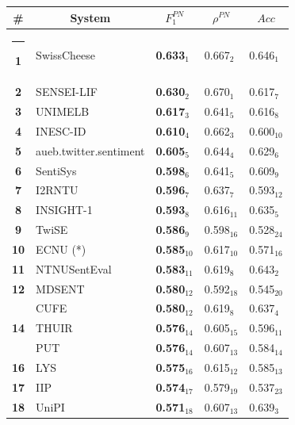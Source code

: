 \documentclass[11pt,letterpaper]{article}
\begin{document}
\renewcommand{\baselinestretch}{0.78}
\begin{table}[tbh]
  \centering
  \begin{small}
    \renewcommand{\arraystretch}{1.0}%
    \resizebox{\columnwidth}{!} {
    \begin{tabular}{|c|l|l|l|l|}
      \hline\rule[0ex]{0mm}{2ex}
      \bf \# & \multicolumn{1}{c|}{\bf System} & \multicolumn{1}{c|}{$F_{1}^{PN}$} & \multicolumn{1}{c|}{$\rho^{PN}$} & \multicolumn{1}{c|}{$Acc$} \\
      \hline\rule[0ex]{-1mm}{2ex} 
      \bf 1 & SwissCheese & \bf 0.633$_{1}$ & 0.667$_{2}$ & 0.646$_{1}$ \\
      \bf 2 & SENSEI-LIF & \bf 0.630$_{2}$ & 0.670$_{1}$ & 0.617$_{7}$ \\
      \bf 3 & UNIMELB & \bf 0.617$_{3}$ & 0.641$_{5}$ & 0.616$_{8}$ \\
      \bf 4 & INESC-ID & \bf 0.610$_{4}$ & 0.662$_{3}$ & 0.600$_{10}$ \\
      \bf 5 & aueb.twitter.sentiment & \bf 0.605$_{5}$ & 0.644$_{4}$ & 0.629$_{6}$ \\
      \bf 6 & SentiSys & \bf 0.598$_{6}$ & 0.641$_{5}$ & 0.609$_{9}$ \\
      \bf 7 & I2RNTU & \bf 0.596$_{7}$ & 0.637$_{7}$ & 0.593$_{12}$ \\
      \bf 8 & INSIGHT-1 & \bf 0.593$_{8}$ & 0.616$_{11}$ & 0.635$_{5}$ \\
      \bf 9 & TwiSE & \bf 0.586$_{9}$ & 0.598$_{16}$ & 0.528$_{24}$ \\
      \bf 10 & ECNU (*) & \bf 0.585$_{10}$ & 0.617$_{10}$ & 0.571$_{16}$ \\
      \bf 11 & NTNUSentEval & \bf 0.583$_{11}$ & 0.619$_{8}$ & 0.643$_{2}$ \\
      \bf 12 & MDSENT & \bf 0.580$_{12}$ & 0.592$_{18}$ & 0.545$_{20}$ \\
      & CUFE & \bf 0.580$_{12}$ & 0.619$_{8}$ & 0.637$_{4}$ \\
      \bf 14 & THUIR & \bf 0.576$_{14}$ & 0.605$_{15}$ & 0.596$_{11}$ \\
      & PUT & \bf 0.576$_{14}$ & 0.607$_{13}$ & 0.584$_{14}$ \\
      \bf 16 & LYS & \bf 0.575$_{16}$ & 0.615$_{12}$ & 0.585$_{13}$ \\
      \bf 17 & IIP & \bf 0.574$_{17}$ & 0.579$_{19}$ & 0.537$_{23}$ \\
      \bf 18 & UniPI & \bf 0.571$_{18}$ & 0.607$_{13}$ & 0.639$_{3}$ \\

\end{tabular}}
\end{small}
\end{table}
\end{document}
